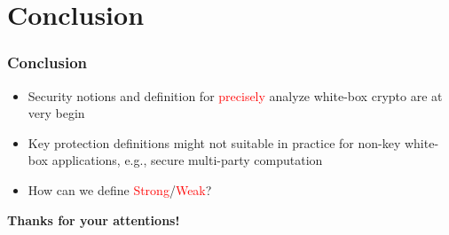 \documentclass[aspectratio=169,xcolor=dvipsnames]{beamer}
\begin{document}
\section{Conclusion}

\frame
{
\frametitle{Conclusion}

\begin{itemize}
\setlength{\itemsep}{12pt}
\item Security notions and definition for \textcolor{red}{precisely} analyze white-box crypto are at very begin

\item Key protection definitions might not suitable in practice for non-key white-box applications, e.g., secure multi-party computation

\item How can we define \textcolor{red}{Strong}/\textcolor{red}{Weak}?
\end{itemize}

}

\frame
{
\begin{center}
\textbf{Thanks for your attentions!}
\end{center}
\begin{center}

\end{center}
}
\end{document}
